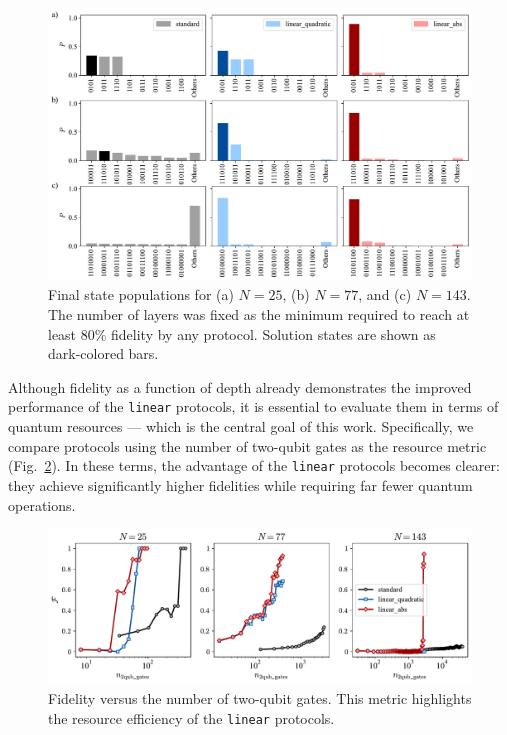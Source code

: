 \begin{figure}[h]
    \centering
    \includegraphics[width=1\textwidth]{04-results/figs/populations_2577143.pdf}
    \caption{Final state populations for (a) $N=25$, (b) $N=77$, and (c) $N=143$. The number
    of layers was fixed as the minimum required to reach at least 80\% fidelity by any
    protocol. Solution states are shown as dark-colored bars.}
    \label{fig:populations}
\end{figure}

Although fidelity as a function of depth already demonstrates the improved performance of the \texttt{linear} protocols, it is essential to evaluate them in terms of quantum resources --- which is the central goal of this work. Specifically, we compare protocols using the number of two-qubit gates as the resource metric (Fig.~\ref{fig:fidelity_gates}). In these terms, the advantage of the \texttt{linear} protocols becomes clearer: they achieve significantly higher fidelities while requiring far fewer quantum operations.  

\begin{figure}[h]
    \centering
    \includegraphics[width=1\textwidth]{04-results/figs/fidelity_gates_2577143.pdf}
    \caption{Fidelity versus the number of two-qubit gates. This metric highlights the resource efficiency of the \texttt{linear} protocols.}
    \label{fig:fidelity_gates}
\end{figure}


